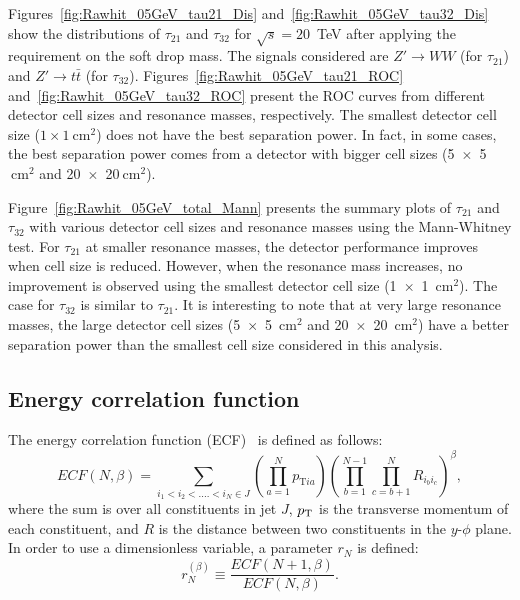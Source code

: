 Figures~\ref{fig:Rawhit_05GeV_tau21_Dis} and~\ref{fig:Rawhit_05GeV_tau32_Dis} 
show the distributions of $\tau_{21}$ and $\tau_{32}$ for $\sqrt{s}=20$~TeV 
after applying the requirement on the soft drop mass. The signals considered are 
$Z'\rightarrow WW$ (for $\tau_{21}$) and 
$Z' \rightarrow t\bar{t}$ (for $\tau_{32}$). 
Figures~\ref{fig:Rawhit_05GeV_tau21_ROC} and~\ref{fig:Rawhit_05GeV_tau32_ROC} 
present the ROC curves from different detector cell sizes and resonance masses, 
respectively. The smallest detector cell size ($1\times1~\mathrm{cm}^2$) 
does not have the best separation power. In fact, in some cases, 
the best separation power comes from a detector with bigger cell sizes 
(5~$\times$~5$~\mathrm{cm}^2$ and 20~$\times$~20$~\mathrm{cm}^2$).

Figure~\ref{fig:Rawhit_05GeV_total_Mann} presents the summary plots of $\tau_{21}$ and $\tau_{32}$ with various detector cell sizes and resonance masses using the Mann-Whitney test. 
 For $\tau_{21}$ at smaller resonance masses, the detector performance improves when cell size is reduced. However, 
when the resonance mass increases, no improvement 
is observed using the smallest detector cell size (1~$\times$~1~$\mathrm{cm}^2$). 
The case for $\tau_{32}$ is similar to  $\tau_{21}$. It is interesting to note that at very large  
resonance masses, the large detector cell sizes (5~$\times$~5~$\mathrm{cm}^2$ and 20~$\times$~20~$\mathrm{cm}^2$) have a 
better separation power than the smallest 
cell  size considered in this analysis. 

\subsection{Energy correlation function \label{sec:ecf}}
The energy correlation function (ECF)~\cite{Larkoski:2013eya} is defined as follows: 
\begin{equation} \label{eq:ECF_Modified}
ECF(N,\beta)=\sum_{i_{1}<i_{2}<....<i_{N}\in J} \left(\prod_{a=1}^{N}p_{\mathrm{T}ia}\right)\left(\prod_{b=1}^{N-1}\prod_{c=b+1}^{N} R_{i_{b}i_{c}}\right)^{\beta},
\end{equation}
where the sum is over all constituents in jet $J$, $p_{\mathrm{T}}$ is the transverse 
momentum of each constituent, and $R$ is the distance between two constituents in the $y$-$\phi$ plane.  
In order to use a dimensionless variable, a parameter $r_{N}$ is defined:
\begin{equation} \label{eq:ECF_ratio}
r_{N}^{(\beta)}\equiv\frac{ECF(N+1,\beta)}{ECF(N,\beta)}.
\end{equation}

